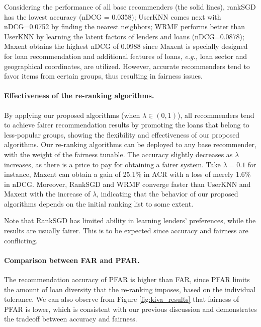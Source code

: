 Considering the performance of all base recommenders (the solid lines), rankSGD has the lowest accuracy (nDCG = 0.0358); UserKNN comes next with nDCG=0.0752 by finding the nearest neighbors; WRMF performs better than UserKNN by learning the latent factors of lenders and loans (nDCG=0.0878); Maxent obtains the highest nDCG of 0.0988 since Maxent is specially designed for loan recommendation and additional features of loans, \emph{e.g.,} loan sector and geographical coordinates, are utilized. However, accurate recommenders tend to favor items from certain groups, thus resulting in fairness issues.

\paragraph{Effectiveness of the re-ranking algorithms.} By applying our proposed algorithms (when $\lambda\in(0,1)$), all recommenders tend to achieve fairer recommendation results by promoting the loans that belong to less-popular groups, showing the flexibility and effectiveness of our proposed algorithms. Our re-ranking algorithms can be deployed to any base recommender, with the weight of the fairness tunable. The accuracy slightly decreases as $\lambda$ increases, as there is a price to pay for obtaining a fairer system. Take $\lambda=0.1$ for instance, Maxent can obtain a gain of 25.1\% in ACR with a loss of merely 1.6\% in nDCG. Moreover, RankSGD and WRMF converge faster than UserKNN and Maxent with the increase of $\lambda$, indicating that the behavior of our proposed algorithms depends on the initial ranking list to some extent. 

Note that RankSGD has limited ability in learning lenders' preferences, while the results are usually fairer. This is to be expected since accuracy and fairness are conflicting.

\paragraph{Comparison between FAR and PFAR.} The recommendation accuracy of PFAR is higher than FAR, since PFAR limits the amount of loan diversity that the re-ranking imposes, based on the individual tolerance. We can also observe from Figure \ref{fig:kiva_results} that fairness of PFAR is lower, which is consistent with our previous discussion and demonstrates the tradeoff between accuracy and fairness.


